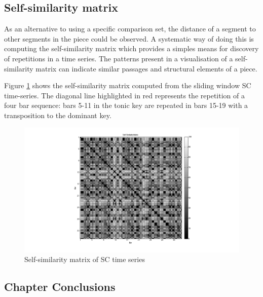 \documentclass{article}
\begin{document}
\subsection{Self-similarity matrix}
\label{sec-9-3}

As an alternative to using a specific comparison set, the distance of
a segment to other segments in the piece could be observed. A
systematic way of doing this is computing the self-similarity matrix
which provides a simples means for discovery of repetitions in a time
series. The patterns present in a visualisation of a self-similarity
matrix can indicate similar passages and structural elements of a
piece.

Figure \ref{fig:selfsimmat} shows the self-similarity matrix computed
from the sliding window SC time-series. The diagonal line highlighted
in red represents the repetition of a four bar sequence: bars 5-11 in
the tonic key are repeated in bars 15-19 with a transposition to the
dominant key.

\begin{figure}[htb]
\centering
\includegraphics[scale=0.3]{../plots/selfsimmat.png}
\caption{\label{fig:selfsimmat}Self-similarity matrix of SC time series}
\end{figure}
\subsection{Chapter Conclusions}
\label{sec-9-4}
\end{document}
